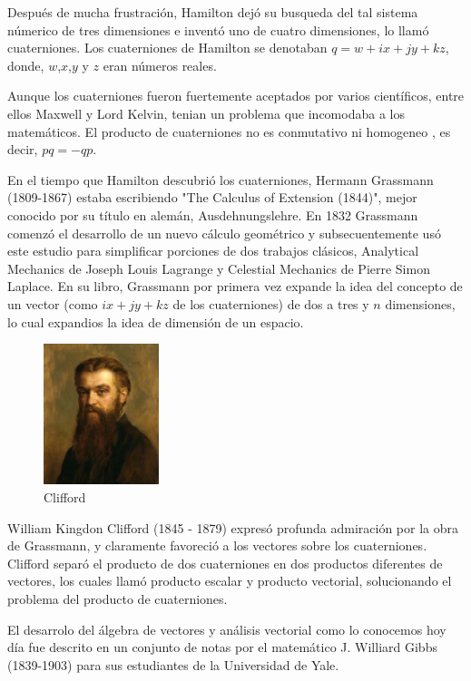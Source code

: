 Después de mucha frustración, Hamilton dejó su busqueda del tal sistema númerico de tres dimensiones e inventó
uno de cuatro dimensiones, lo llamó cuaterniones. Los cuaterniones de Hamilton se denotaban $q = w + ix + jy + kz$, donde, $w$,$x$,$y$ y $z$ eran números reales.

Aunque los cuaterniones fueron fuertemente aceptados por varios científicos, entre ellos Maxwell y Lord Kelvin,
tenian un problema que incomodaba a los matemáticos. El producto de cuaterniones no es conmutativo ni homogeneo
, es decir, $pq = -qp$.

En el tiempo que Hamilton descubrió los cuaterniones, Hermann Grassmann (1809-1867) estaba escribiendo
"The Calculus of Extension (1844)", mejor conocido por su título en alemán, Ausdehnungslehre. En 1832
Grassmann comenzó el desarrollo de un nuevo cálculo geométrico y subsecuentemente usó este estudio para
simplificar porciones de dos trabajos clásicos, Analytical Mechanics de Joseph Louis Lagrange y Celestial
Mechanics de Pierre Simon Laplace. En su libro, Grassmann por primera vez expande la idea del concepto
de un vector (como $ix + jy + kz$ de los cuaterniones) de dos a tres y $n$ dimensiones, lo cual expandios
la idea de dimensión de un espacio.

\begin{figure}[!ht]
  \begin{center}
    \includegraphics[width=0.3\textwidth]{gfx/clifford}
  \end{center}
  \caption{Clifford}
\end{figure}

William Kingdon Clifford (1845 - 1879) expresó profunda admiración por la obra de Grassmann, y claramente
favoreció a los vectores sobre los cuaterniones. Clifford separó el producto de dos cuaterniones en dos
productos diferentes de vectores, los cuales llamó producto escalar y producto vectorial, solucionando
el problema del producto de cuaterniones.

El desarrolo del álgebra de vectores y análisis vectorial como lo conocemos hoy día fue descrito en un conjunto
de notas por el matemático J. Williard Gibbs (1839-1903) para sus estudiantes de la Universidad de Yale.






